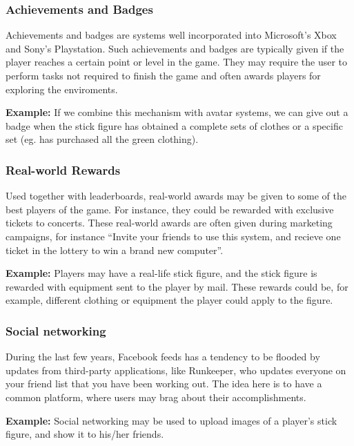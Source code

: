 \subsubsection{Achievements and Badges}
\label{sec:achievementsandbadges}
Achievements and badges are systems well incorporated into Microsoft's Xbox and Sony's Playstation. Such achievements and badges are typically given if the player reaches a certain point or level in the game. They may require the user to perform tasks not required to finish the game and often awards players for exploring the enviroments. 

\textbf{Example:} If we combine this mechanism with avatar systems, we can give out a badge when the stick figure has obtained a complete sets of clothes or a specific set (eg. has purchased all the green clothing).   

\subsubsection{Real-world Rewards}
\label{sec:realworldrewards}
Used together with leaderboards, real-world awards may be given to some of the best players of the game. For instance, they could be rewarded with exclusive tickets to concerts. These real-world awards are often given during marketing campaigns, for instance ``Invite your friends to use this system, and recieve one ticket in the lottery to win a brand new computer''.  

\textbf{Example:} Players may have a real-life stick figure, and the stick figure is rewarded with equipment sent to the player by mail. These rewards could be, for example, different clothing or equipment the player could apply to the figure. 

\subsubsection{Social networking}
\label{sec:socialnetworking}
During the last few years, Facebook feeds has a tendency to be flooded by updates from third-party applications, like Runkeeper, who updates everyone on your friend list that you have been working out. The idea here is to have a common platform, where users may brag about their accomplishments.      

\textbf{Example:} Social networking may be used to upload images of a player's stick figure, and show it to his/her friends. 

